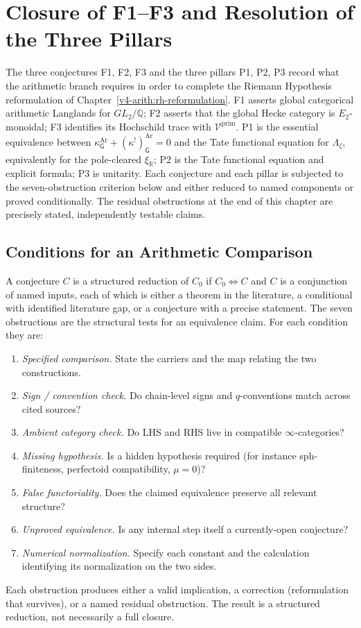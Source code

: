 \chapter{Closure of F1--F3 and Resolution of the Three Pillars}
\label{v4-arith:closure}

The three conjectures F1, F2, F3 and the three pillars P1, P2, P3 record what the arithmetic branch requires in order to complete the Riemann Hypothesis reformulation of Chapter~\ref{v4-arith:rh-reformulation}. F1 asserts global categorical arithmetic Langlands for \(GL_{2}/\mathbb{Q}\); F2 asserts that the global Hecke category is \(E_{2}\)-monoidal; F3 identifies its Hochschild trace with \(\mathcal{V}^{\mathrm{prim}}\). P1 is the essential equivalence between \(\kappa^{\mathrm{Ar}}_{\mathsf{G}}+(\kappa^{!})^{\mathrm{Ar}}_{\mathsf{G}}=0\) and the Tate functional equation for \(\Lambda_{\zeta}\), equivalently for the pole-cleared \(\xi_{\mathbb R}\); P2 is the Tate functional equation and explicit formula; P3 is unitarity. Each conjecture and each pillar is subjected to the seven-obstruction criterion below and either reduced to named components or proved conditionally. The residual obstructions at the end of this chapter are precisely stated, independently testable claims.

\section{Conditions for an Arithmetic Comparison}
\label{v4-arith:cl:criterion}

A conjecture \(C\) is a structured reduction of \(C_{0}\) if
\(C_{0}\Leftrightarrow C\) and \(C\) is a conjunction of named inputs,
each of which is either a theorem in the literature, a conditional
with identified literature gap, or a conjecture with a precise
statement. The seven obstructions are the structural tests for an
equivalence claim. For each condition they are:
\begin{enumerate}
\item \emph{Specified comparison.} State the carriers and the map
relating the two constructions.
\item \emph{Sign / convention check.} Do chain-level signs and
\(q\)-conventions match across cited sources?
\item \emph{Ambient category check.} Do LHS and RHS live in
compatible \(\infty\)-categories?
\item \emph{Missing hypothesis.} Is a hidden hypothesis required
(for instance sph-finiteness, perfectoid compatibility, \(\mu=0\))?
\item \emph{False functoriality.} Does the claimed equivalence
preserve all relevant structure?
\item \emph{Unproved equivalence.} Is any internal step itself a
currently-open conjecture?
\item \emph{Numerical normalization.} Specify each constant and
the calculation identifying its normalization on the two sides.
\end{enumerate}
Each obstruction produces either a valid implication, a correction (reformulation
that survives), or a named residual obstruction. The result is a
structured reduction, not necessarily a full closure.

